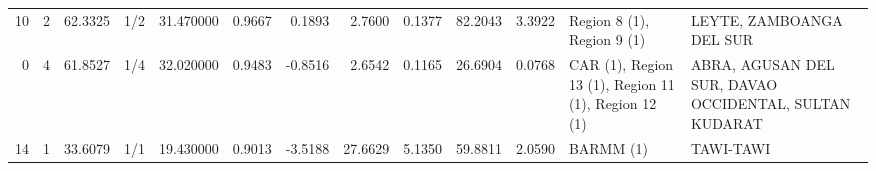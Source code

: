 \begin{tabular}{rrrlrrrrrrrll}
10 & 2 & {\cellcolor[HTML]{F7BA9F}} \color[HTML]{000000} 62.3325 & 1/2 & {\cellcolor[HTML]{F0CDBB}} \color[HTML]{000000} 31.470000 & 0.9667 & 0.1893 & 2.7600 & 0.1377 & 82.2043 & 3.3922 & Region 8 (1), Region 9 (1) & LEYTE, ZAMBOANGA DEL SUR \\
0 & 4 & {\cellcolor[HTML]{F6BEA4}} \color[HTML]{000000} 61.8527 & 1/4 & {\cellcolor[HTML]{F2C9B4}} \color[HTML]{000000} 32.020000 & 0.9483 & -0.8516 & 2.6542 & 0.1165 & 26.6904 & 0.0768 & CAR (1), Region 13 (1), Region 11 (1), Region 12 (1) & ABRA, AGUSAN DEL SUR, DAVAO OCCIDENTAL, SULTAN KUDARAT \\
14 & 1 & {\cellcolor[HTML]{3B4CC0}} \color[HTML]{F1F1F1} 33.6079 & 1/1 & {\cellcolor[HTML]{6A8BEF}} \color[HTML]{F1F1F1} 19.430000 & 0.9013 & -3.5188 & 27.6629 & 5.1350 & 59.8811 & 2.0590 & BARMM (1) & TAWI-TAWI \\
\bottomrule
\end{tabular}
